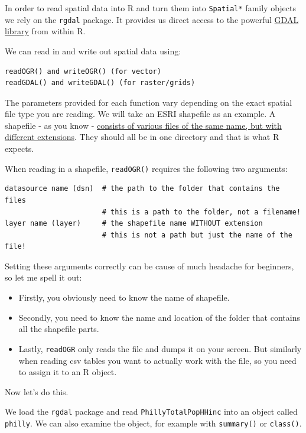 \documentclass[]{book}
\theoremstyle{definition}
\theoremstyle{definition}
\theoremstyle{definition}
\theoremstyle{remark}
\begin{document}
In order to read spatial data into R and turn them into
\texttt{Spatial*} family objects we rely on the \texttt{rgdal} package.
It provides us direct access to the powerful \href{http://gdal.org}{GDAL
library} from within R.

We can read in and write out spatial data using:

\begin{verbatim}
readOGR() and writeOGR() (for vector)  
readGDAL() and writeGDAL() (for raster/grids)
\end{verbatim}

The parameters provided for each function vary depending on the exact
spatial file type you are reading. We will take an ESRI shapefile as an
example. A shapefile - as you know -
\href{https://en.wikipedia.org/wiki/Shapefile}{consists of various files
of the same name, but with different extensions}. They should all be in
one directory and that is what R expects.

When reading in a shapefile, \texttt{readOGR()} requires the following
two arguments:

\begin{verbatim}
datasource name (dsn)  # the path to the folder that contains the files
                       # this is a path to the folder, not a filename!
layer name (layer)     # the shapefile name WITHOUT extension
                       # this is not a path but just the name of the file!
\end{verbatim}

Setting these arguments correctly can be cause of much headache for
beginners, so let me spell it out:

\begin{itemize}
\item
  Firstly, you obviously need to know the name of shapefile.
\item
  Secondly, you need to know the name and location of the folder that
  contains all the shapefile parts.
\item
  Lastly, \texttt{readOGR} only reads the file and dumps it on your
  screen. But similarly when reading csv tables you want to actually
  work with the file, so you need to assign it to an R object.
\end{itemize}

Now let's do this.

We load the \texttt{rgdal} package and read \texttt{PhillyTotalPopHHinc}
into an object called \texttt{philly}. We can also examine the object,
for example with \texttt{summary()} or \texttt{class()}.
\end{document}
